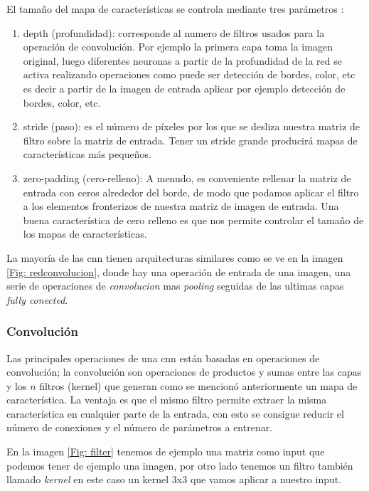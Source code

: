 El tamaño del mapa de características se controla mediante tres parámetros \citep{cnnsarticle}:
\begin{enumerate}
\item depth (profundidad): corresponde al numero de filtros usados para la operación de convolución. Por ejemplo la primera capa toma la imagen original, luego diferentes neuronas a partir de la profundidad de la red se activa realizando operaciones como puede ser detección de bordes, color, etc
es decir a partir de la imagen de entrada aplicar por ejemplo detección de bordes, color, etc.
\item stride (paso): es el número de píxeles por los que se desliza nuestra matriz de filtro sobre la matriz de entrada. Tener un stride grande producirá mapas de características más pequeños.
\item zero-padding (cero-relleno): A menudo, es conveniente rellenar la matriz de entrada con ceros alrededor del borde, de modo que podamos aplicar el filtro a los elementos fronterizos de nuestra matriz de imagen de entrada. Una buena característica de cero relleno es que nos permite controlar el tamaño de los mapas de características.
\end{enumerate}

La mayoría de las \ac{cnn} tienen arquitecturas similares como se ve en la imagen \ref{Fig: redconvolucion}, donde hay una operación de entrada de una imagen, una serie de operaciones de  \textit{convolucion} mas  \textit{pooling} seguidas de las ultimas capas \textit{fully conected}. 

\subsubsection{Convolución}\label{sub:convolucion}

Las principales operaciones de una \ac{cnn} están basadas en operaciones de convolución; la convolución son operaciones de productos y sumas entre las capas y los $n $ filtros (kernel) que generan como se mencionó anteriormente un mapa de característica. La ventaja es que el mismo filtro permite extraer la misma característica en cualquier parte de la entrada, con esto se consigue reducir el número de conexiones y el número de parámetros a entrenar.

En la imagen \ref{Fig: filter} tenemos de ejemplo una matriz como input que podemos tener de ejemplo una imagen, por otro lado tenemos un filtro también llamado \textit{kernel} en este caso un kernel 3x3 que vamos aplicar a nuestro input.


